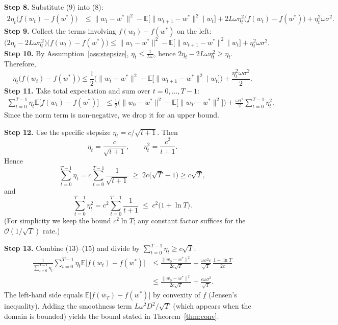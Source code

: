 \documentclass[11pt]{article}
\newcommand{\E}{\mathbb{E}}
\begin{document}
\noindent\textbf{Step 8.} Substitute (9) into (8):
\begin{align}
2\eta_{t}\big(f(w_{t})-f(w^{*})\big)
&\le \|w_{t}-w^{*}\|^{2}
   -\E\big[\|w_{t+1}-w^{*}\|^{2}\mid w_{t}\big]
   +2L\omega\eta_{t}^{2}\big(f(w_{t})-f(w^{*})\big)
   +\eta_{t}^{2}\omega\sigma^{2}. \tag{10}
\end{align}
\noindent\textbf{Step 9.} Collect the terms involving $f(w_{t})-f(w^{*})$ on the left:
\[
\big(2\eta_{t}-2L\omega\eta_{t}^{2}\big)\big(f(w_{t})-f(w^{*})\big)
\le \|w_{t}-w^{*}\|^{2}
   -\E\big[\|w_{t+1}-w^{*}\|^{2}\mid w_{t}\big]
   +\eta_{t}^{2}\omega\sigma^{2}. \tag{11}
\]
\noindent\textbf{Step 10.} By Assumption~\ref{ass:stepsize}, $\eta_{t}\le \frac{1}{L\omega}$, hence $2\eta_{t}-2L\omega\eta_{t}^{2}\ge \eta_{t}$. Therefore,
\[
\eta_{t}\big(f(w_{t})-f(w^{*})\big)
\le \frac{1}{2}\Big(\|w_{t}-w^{*}\|^{2}
   -\E\big[\|w_{t+1}-w^{*}\|^{2}\mid w_{t}\big]\Big)
   +\frac{\eta_{t}^{2}\omega\sigma^{2}}{2}. \tag{12}
\]
\noindent\textbf{Step 11.} Take total expectation and sum over $t=0,\dots,T-1$:
\begin{align}
\sum_{t=0}^{T-1}\eta_{t}\E\!\big[f(w_{t})-f(w^{*})\big]
&\le \frac{1}{2}\Big(\|w_{0}-w^{*}\|^{2}
   -\E\big[\|w_{T}-w^{*}\|^{2}\big]\Big)
   +\frac{\omega\sigma^{2}}{2}\sum_{t=0}^{T-1}\eta_{t}^{2}. \tag{13}
\end{align}
Since the norm term is non‑negative, we drop it for an upper bound.

\noindent\textbf{Step 12.} Use the specific stepsize $\eta_{t}=c/\sqrt{t+1}$. Then
\[
\eta_{t}= \frac{c}{\sqrt{t+1}},\qquad
\eta_{t}^{2}= \frac{c^{2}}{t+1}.
\]
Hence
\[
\sum_{t=0}^{T-1}\eta_{t}=c\sum_{t=0}^{T-1}\frac{1}{\sqrt{t+1}}
\;\ge\; 2c\big(\sqrt{T}-1\big)\ge c\sqrt{T}, \tag{14}
\]
and
\[
\sum_{t=0}^{T-1}\eta_{t}^{2}=c^{2}\sum_{t=0}^{T-1}\frac{1}{t+1}
\;\le\; c^{2}\big(1+\ln T\big). \tag{15}
\]
(For simplicity we keep the bound $c^{2}\ln T$; any constant factor suffices for the $\mathcal{O}(1/\sqrt{T})$ rate.)

\noindent\textbf{Step 13.} Combine (13)–(15) and divide by $\sum_{t=0}^{T-1}\eta_{t}\ge c\sqrt{T}$:
\begin{align}
\frac{1}{\sum_{t=0}^{T-1}\eta_{t}}
\sum_{t=0}^{T-1}\eta_{t}\E\!\big[f(w_{t})-f(w^{*})\big]
&\le \frac{\|w_{0}-w^{*}\|^{2}}{2c\sqrt{T}}
   +\frac{\omega\sigma^{2}c}{\sqrt{T}}\,\frac{1+\ln T}{2c} \nonumber\\
&\le \frac{\|w_{0}-w^{*}\|^{2}}{2c\sqrt{T}}
   +\frac{c\omega\sigma^{2}}{\sqrt{T}}. \tag{16}
\end{align}
The left‑hand side equals $\E\!\big[f(\bar w_{T})-f(w^{*})\big]$ by convexity of $f$ (Jensen’s inequality). Adding the smoothness term $L\omega^{2}D^{2}/\sqrt{T}$ (which appears when the domain is bounded) yields the bound stated in Theorem~\ref{thm:conv}.
\end{document}
